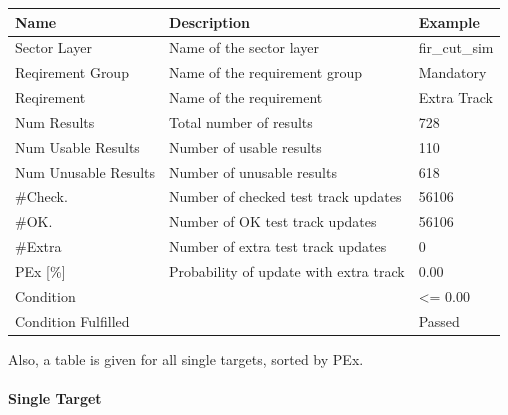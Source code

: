 \begin{center}
 \begin{table}[H]
  \begin{tabularx}{\textwidth}{ | l | X |  l | }
    \hline
    \textbf{Name} & \textbf{Description} & \textbf{Example} \\ \hline
    Sector Layer & Name of the sector layer & fir\_cut\_sim \\ \hline
    Reqirement Group & Name of the requirement group & Mandatory \\ \hline
    Reqirement & Name of the requirement & Extra Track \\ \hline
    Num Results & Total number of results & 728 \\ \hline
    Num Usable Results & Number of usable results & 110 \\ \hline
    Num Unusable Results & Number of unusable results & 618 \\ \hline
    \#Check. & Number of checked test track updates & 56106 \\ \hline
    \#OK. & Number of OK test track updates & 56106 \\ \hline
    \#Extra & Number of extra test track updates & 0 \\ \hline
    PEx [\%] & Probability of update with extra track & 0.00 \\ \hline
    Condition &  & <= 0.00 \\ \hline
    Condition Fulfilled &  & Passed \\ \hline
\end{tabularx}
\end{table}
\end{center}

Also, a table is given for all single targets, sorted by PEx.

\paragraph{Single Target}

